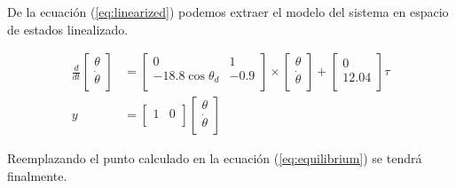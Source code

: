 \documentclass[12pt]{article}
\begin{document}
De la ecuación (\ref{eq:linearized}) podemos extraer el modelo del sistema en espacio de estados linealizado.

\begin{equation}
    \begin{split}
        \frac{d}{dt}
    \begin{bmatrix}
        \theta  \\
        \dot{\theta} \\ 
    \end{bmatrix}&=\begin{bmatrix}
        0 & 1  \\
        -18.8\cos{\theta_d} & -0.9 \\ 
    \end{bmatrix}
    \times
    \begin{bmatrix}
     \theta \\
      \dot{\theta} \\
      \end{bmatrix}+\begin{bmatrix}
     0 \\
     12.04 \\
      \end{bmatrix}\tau\\ 
      y&=\begin{bmatrix}
     1 & 0 \\
      \end{bmatrix}
      \begin{bmatrix}
     \theta \\
     \dot{\theta} \\
      \end{bmatrix}
    \end{split}
    \label{eq:lined_model}
\end{equation}

Reemplazando el punto calculado en la ecuación (\ref{eq:equilibrium}) se tendrá finalmente.
\end{document}
